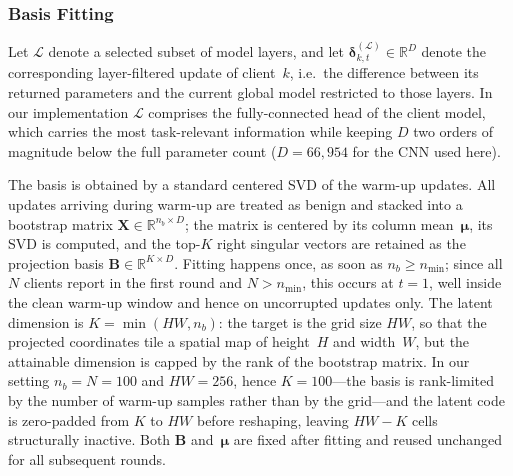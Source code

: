 \documentclass[journal]{IEEEtran}
\begin{document}
\subsubsection{Basis Fitting}
Let $\mathcal{L}$ denote a selected subset of model layers, and let $\boldsymbol{\delta}_{k,t}^{(\mathcal{L})} \in \mathbb{R}^{D}$ denote the corresponding layer-filtered update of client~$k$, i.e.\ the difference between its returned parameters and the current global model restricted to those layers. In our implementation $\mathcal{L}$ comprises the fully-connected head of the client model, which carries the most task-relevant information while keeping $D$ two orders of magnitude below the full parameter count ($D = 66{,}954$ for the CNN used here).

The basis is obtained by a standard centered SVD of the warm-up updates. All updates arriving during warm-up are treated as benign and stacked into a bootstrap matrix $\mathbf{X} \in \mathbb{R}^{n_b \times D}$; the matrix is centered by its column mean~$\boldsymbol{\mu}$, its SVD is computed, and the top-$K$ right singular vectors are retained as the projection basis $\mathbf{B} \in \mathbb{R}^{K \times D}$. Fitting happens once, as soon as $n_b \geq n_{\min}$; since all $N$ clients report in the first round and $N > n_{\min}$, this occurs at $t = 1$, well inside the clean warm-up window and hence on uncorrupted updates only. The latent dimension is $K = \min(HW, n_b)$: the target is the grid size $HW$, so that the projected coordinates tile a spatial map of height~$H$ and width~$W$, but the attainable dimension is capped by the rank of the bootstrap matrix. In our setting $n_b = N = 100$ and $HW = 256$, hence $K = 100$---the basis is rank-limited by the number of warm-up samples rather than by the grid---and the latent code is zero-padded from $K$ to $HW$ before reshaping, leaving $HW - K$ cells structurally inactive. Both $\mathbf{B}$ and~$\boldsymbol{\mu}$ are fixed after fitting and reused unchanged for all subsequent rounds.
\end{document}
